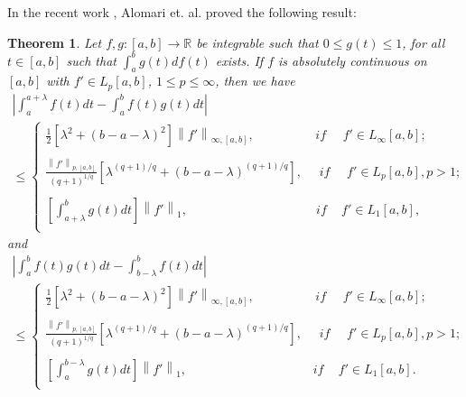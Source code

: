 \documentclass{amsart}
\newtheorem{theorem}{Theorem}
\theoremstyle{plain}
\numberwithin{equation}{section}
\begin{document}
 In the recent work \cite{RefA}, Alomari et. al. proved
the following result:
\begin{theorem}
\label{thm5}Let $f,g: [a,b] \to \mathbb{R}$ be integrable such
that $0 \le g(t) \le 1$, for all $t \in [a,b]$ such that $\int_a^b
{g\left( t \right)df\left( t \right)}$ exists. If $f$ is
absolutely continuous on $[a,b]$ with $f' \in L_p[a,b]$, $1 \le p
\le \infty$, then we have
\begin{multline}
\label{eq2.16}\left| {\int_a^{a + \lambda } {f\left( t \right)dt -
\int_a^b {f\left( t \right)g\left( t \right)dt} } } \right|
\\
\le \left\{
\begin{array}{l}
 \frac{1}{2}\left[ {\lambda ^2  + \left( {b - a - \lambda }
\right)^2 } \right] \left\| {f'} \right\|_{\infty ,\left[ {a,b}
\right]},\,\,\,\,\,\,\,\,\,\,\,\,\,\,\,\,\,\,\,\,\,\,\,\,\,\,\,\,\,if\,\,\,\,\,\,\,\,f' \in L_\infty  [a,b]; \\
  \\
 \frac{\left\| {f'} \right\|_{p ,\left[ {a,b}
\right]}}{{\left( {q + 1} \right)^{1/q} }} \left[ {\lambda
^{\left( {q + 1} \right)/q}  + \left( {b - a - \lambda }
\right)^{\left( {q + 1} \right)/q} } \right],\,\,\,\,\,\,\,\,if\,\,\,\,\,\,\,\,f' \in L_p [a,b],p > 1; \\
  \\
 \left[ \int_{a + \lambda }^b {g\left( t \right)dt}
\right]\left\| {f'} \right\|_1 ,\,\,\,\,\,\,\,\,\,\,\,\,\,\,\,\,\,\,\,\,\,\,\,\,\,\,\,\,\,\,\,\,\,\,\,\,\,\,\,\,\,\,\,\,\,\,\,\,\,\,\,\,\,\,\,\,\,\,\,\,\,if\,\,\,\,\,\,\,f' \in L_1 [a,b], \\
 \end{array} \right.
\end{multline}
and
\begin{multline}
\label{eq2.17}\left| {\int_a^b {f\left( t \right)g\left( t
\right)dt - \int_{b - \lambda }^b {f\left( t \right)dt} } }
\right|
\\
\le \left\{
\begin{array}{l}
 \frac{1}{2}\left[ {\lambda ^2  + \left( {b - a - \lambda }
\right)^2 } \right] \left\| {f'} \right\|_{\infty ,\left[ {a,b}
\right]},\,\,\,\,\,\,\,\,\,\,\,\,\,\,\,\,\,\,\,\,\,\,\,\,\,\,\,\,\,if\,\,\,\,\,\,\,\,f' \in L_\infty  [a,b]; \\
  \\
 \frac{\left\| {f'} \right\|_{p ,\left[ {a,b}
\right]}}{{\left( {q + 1} \right)^{1/q} }} \left[ {\lambda
^{\left( {q + 1} \right)/q}  + \left( {b - a - \lambda }
\right)^{\left( {q + 1} \right)/q} } \right],\,\,\,\,\,\,\,\,if\,\,\,\,\,\,\,\,f' \in L_p [a,b],p > 1; \\
  \\
 \left[ \int_a^{b - \lambda } {g\left( t \right)dt}
\right]\left\| {f'} \right\|_1 ,\,\,\,\,\,\,\,\,\,\,\,\,\,\,\,\,\,\,\,\,\,\,\,\,\,\,\,\,\,\,\,\,\,\,\,\,\,\,\,\,\,\,\,\,\,\,\,\,\,\,\,\,\,\,\,\,\,\,\,\,if\,\,\,\,\,\,\,f' \in L_1 [a,b]. \\
 \end{array} \right.
\end{multline}
\end{theorem}
\end{document}
